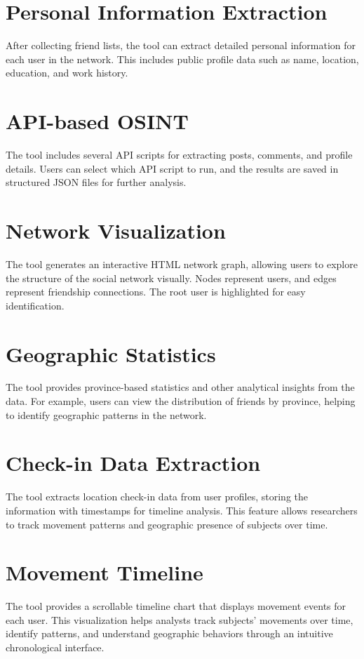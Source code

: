 \documentclass[13pt,a4paper]{report}
\begin{document}
\section{Personal Information Extraction}
After collecting friend lists, the tool can extract detailed personal information for each user in the network. This includes public profile data such as name, location, education, and work history.

\section{API-based OSINT}
The tool includes several API scripts for extracting posts, comments, and profile details. Users can select which API script to run, and the results are saved in structured JSON files for further analysis.

\section{Network Visualization}
The tool generates an interactive HTML network graph, allowing users to explore the structure of the social network visually. Nodes represent users, and edges represent friendship connections. The root user is highlighted for easy identification.

\section{Geographic Statistics}
The tool provides province-based statistics and other analytical insights from the data. For example, users can view the distribution of friends by province, helping to identify geographic patterns in the network.

\section{Check-in Data Extraction}
The tool extracts location check-in data from user profiles, storing the information with timestamps for timeline analysis. This feature allows researchers to track movement patterns and geographic presence of subjects over time.

\section{Movement Timeline}
The tool provides a scrollable timeline chart that displays movement events for each user. This visualization helps analysts track subjects' movements over time, identify patterns, and understand geographic behaviors through an intuitive chronological interface.
\end{document}
